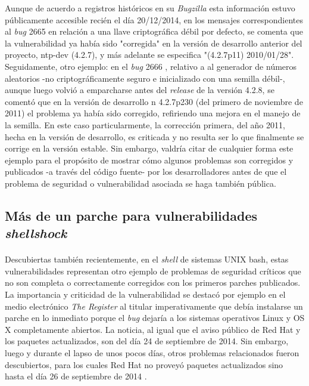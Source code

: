 \documentclass[11pt,a4paper]{article}
\begin{document}
Aunque de acuerdo a registros históricos en su \textit{Bugzilla} esta información estuvo públicamente accesible recién el día 20/12/2014, en los mensajes correspondientes al \textit{bug} 2665 \cite{ntpBug1} en relación a una llave criptográfica débil por defecto, se comenta que la vulnerabilidad ya había sido "corregida" en la versión de desarrollo anterior del proyecto, ntp-dev (4.2.7), y más adelante se especifica "(4.2.7p11) 2010/01/28".
\\

Seguidamente, otro ejemplo: en el \textit{bug} 2666 \cite{ntpBug2}, relativo a al generador de números aleatorios -no criptográficamente seguro e inicializado con una semilla débil-, aunque luego volvió a emparcharse antes del \textit{release} de la versión 4.2.8, se comentó que en la versión de desarrollo n 4.2.7p230 (del primero de noviembre de 2011) el problema ya había sido corregido, refiriendo una mejora en el manejo de la semilla. En este caso particularmente, la corrección primera, del año 2011, hecha en la versión de desarrollo, es criticada y no resulta ser lo que finalmente se corrige en la versión estable. Sin embargo, valdría citar de cualquier forma este ejemplo para el propósito de mostrar cómo algunos problemas son corregidos y publicados -a través del código fuente- por los desarrolladores antes de que el problema de seguridad o vulnerabilidad asociada se haga también pública.
\\

\subsection{Más de un parche para vulnerabilidades \textit{shellshock}}

\paragraph{}Descubiertas también recientemente, en el \textit{shell} de sistemas UNIX bash, estas vulnerabilidades representan otro ejemplo de problemas de seguridad críticos que no son completa o correctamente corregidos con los primeros parches publicados. La importancia y criticidad de la vulnerabilidad se destacó por ejemplo en el medio electrónico \textit{The Register} \cite{elreg1} al titular imperativamente que debía instalarse un parche en lo inmediato porque el \textit{bug} dejaría a los sistemas operativos Linux y OS X completamente abiertos. La noticia, al igual que el aviso público de Red Hat \cite{rh1} y los paquetes actualizados, son del día 24 de septiembre de 2014. Sin embargo, luego y durante el lapso de unos pocos días, otros problemas relacionados fueron descubiertos, para los cuales Red Hat no proveyó paquetes actualizados sino hasta el día 26 de septiembre de 2014 \cite{rh2}.
\end{document}
